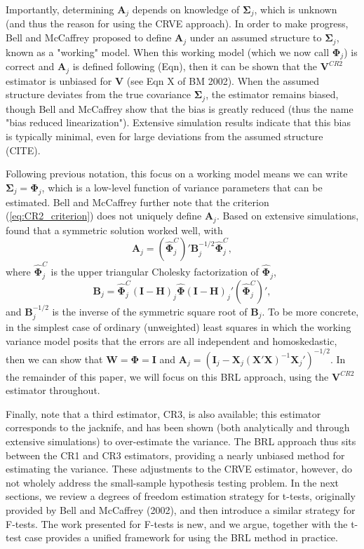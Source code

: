\documentclass[12pt]{article}
\newcommand{\bm}{\mathbf}
\newcommand{\bs}{\boldsymbol}
\begin{document}
Importantly, determining $\bm{A}_j$ depends on knowledge of $\bs{\Sigma}_j$, which is unknown (and thus the reason for using the CRVE approach). In order to make progress, Bell and McCaffrey proposed to define $\bm{A}_j$ under an assumed structure to $\bs{\Sigma}_j$, known as a "working" model. When this working model (which we now call $\bs\Phi_j$) is correct and $\bm{A}_j$ is defined following (Eqn), then it can be shown that the $\bm{V}^{CR2}$ estimator is unbiased for $\bm{V}$ (see Eqn X of BM 2002). When the assumed structure deviates from the true covariance $\bs{\Sigma}_j$, the estimator remains biased, though Bell and McCaffrey show that the bias is greatly reduced (thus the name "bias reduced linearization"). Extensive simulation results indicate that this bias is typically minimal, even for large deviations from the assumed structure (CITE).

Following previous notation, this focus on a working model means we can write $\bs{\Sigma}_j = \bs{\Phi}_j$, which is a low-level function of variance parameters that can be estimated. Bell and McCaffrey further note that the criterion (\ref{eq:CR2_criterion}) does not uniquely define $\bm{A}_j$. Based on extensive simulations, \citet{McCaffrey2001generalizations} found that a symmetric solution worked well, with 
\begin{equation}
\label{eq:CR2_adjustment}
\bm{A}_j = \left(\hat{\bs\Phi}_j^C\right)' \bm{B}_j^{-1/2}\hat{\bs\Phi}_j^C,
\end{equation}
where $\hat{\bs\Phi}_j^C$ is the upper triangular Cholesky factorization of $\hat{\bs\Phi}_j$, 
\begin{equation}
\label{eq:CR2_Bmatrix}
\bm{B}_j = \hat{\bs\Phi}_j^C\left(\bm{I} - \bm{H}\right)_j \hat{\bs\Phi} \left(\bm{I} - \bm{H}\right)_j' \left(\hat{\bs\Phi}_j^C\right)',
\end{equation}
and $\bm{B}_j^{-1/2}$ is the inverse of the symmetric square root of $\bm{B}_j $. To be more concrete, in the simplest case of ordinary (unweighted) least squares in which the working variance model posits that the errors are all independent and homoskedastic, then we can show that $\bm{W} = \bs\Phi = \bm{I}$ and $\bm{A}_j = \left(\bm{I}_j - \bm{X}_j\left(\bm{X}'\bm{X}\right)^{-1}\bm{X}_j'\right)^{-1/2}$. In the remainder of this paper, we will focus on this BRL approach, using the $\bm{V}^{CR2}$ estimator throughout. 

Finally, note that a third estimator, CR3, is also available; this estimator corresponds to the jacknife, and has been shown (both analytically and through extensive simulations) to over-estimate the variance. The BRL approach thus sits between the CR1 and CR3 estimators, providing a nearly unbiased method for estimating the variance. These adjustments to the CRVE estimator, however, do not wholely address the small-sample hypothesis testing problem. In the next sections, we review a degrees of freedom estimation strategy for t-tests, originally provided by Bell and McCaffrey (2002), and then introduce a similar strategy for F-tests. The work presented for F-tests is new, and we argue, together with the t-test case provides a unified framework for using the BRL method in practice. 
\end{document}
